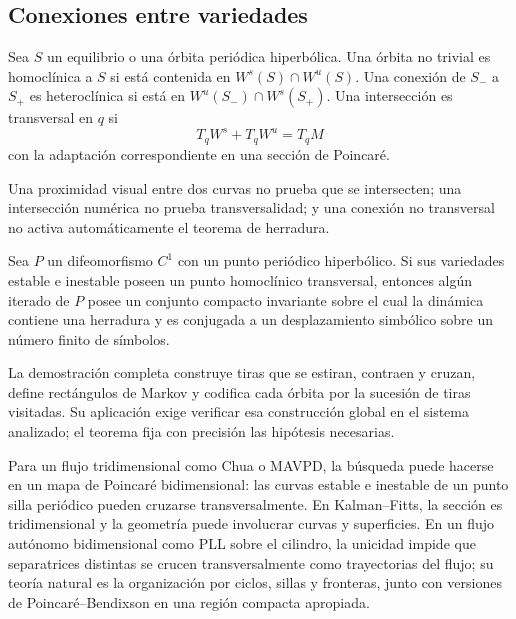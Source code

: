 \subsection{Conexiones entre variedades}

\begin{definition}
Sea \(S\) un equilibrio o una órbita periódica hiperbólica. Una órbita no
trivial es homoclínica a \(S\) si está contenida en
\(W^s(S)\cap W^u(S)\). Una conexión de \(S_-\) a \(S_+\) es heteroclínica si
está en \(W^u(S_-)\cap W^s(S_+)\). Una intersección es transversal en \(q\)
si
\begin{equation}
 T_qW^s+T_qW^u=T_qM
 \label{geo:eq:transverse-intersection}
\end{equation}
con la adaptación correspondiente en una sección de Poincaré.
\end{definition}

Una proximidad visual entre dos curvas no prueba que se intersecten; una
intersección numérica no prueba transversalidad; y una conexión no transversal
no activa automáticamente el teorema de herradura.

\begin{proposition}
Sea \(P\) un difeomorfismo \(C^1\) con un punto periódico hiperbólico. Si sus
variedades estable e inestable poseen un punto homoclínico transversal,
entonces algún iterado de \(P\) posee un conjunto compacto invariante sobre el
cual la dinámica contiene una herradura y es conjugada a un desplazamiento
simbólico sobre un número finito de símbolos.
\end{proposition}

La demostración completa construye tiras que se estiran, contraen y cruzan,
define rectángulos de Markov y codifica cada órbita por la sucesión de tiras
visitadas. Su aplicación exige verificar esa construcción global en el sistema
analizado; el teorema fija con precisión las hipótesis necesarias.



Para un flujo tridimensional como Chua o MAVPD, la búsqueda puede hacerse en
un mapa de Poincaré bidimensional: las curvas estable e inestable de un punto
silla periódico pueden cruzarse transversalmente. En Kalman--Fitts, la
sección es tridimensional y la geometría puede involucrar curvas y
superficies. En un flujo autónomo bidimensional como PLL sobre el cilindro, la
unicidad impide que separatrices distintas se crucen transversalmente como
trayectorias del flujo; su teoría natural es la organización por ciclos,
sillas y fronteras, junto con versiones de Poincaré--Bendixson en una región
compacta apropiada.

